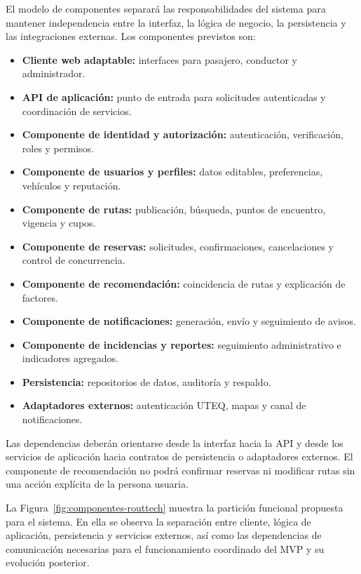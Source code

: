 \documentclass[12pt,a4paper]{article}
\begin{document}
El modelo de componentes separará las responsabilidades del sistema para mantener independencia entre la interfaz, la lógica de negocio, la persistencia y las integraciones externas. Los componentes previstos son:

\begin{itemize}
  \item \textbf{Cliente web adaptable:} interfaces para pasajero, conductor y administrador.
  \item \textbf{API de aplicación:} punto de entrada para solicitudes autenticadas y coordinación de servicios.
  \item \textbf{Componente de identidad y autorización:} autenticación, verificación, roles y permisos.
  \item \textbf{Componente de usuarios y perfiles:} datos editables, preferencias, vehículos y reputación.
  \item \textbf{Componente de rutas:} publicación, búsqueda, puntos de encuentro, vigencia y cupos.
  \item \textbf{Componente de reservas:} solicitudes, confirmaciones, cancelaciones y control de concurrencia.
  \item \textbf{Componente de recomendación:} coincidencia de rutas y explicación de factores.
  \item \textbf{Componente de notificaciones:} generación, envío y seguimiento de avisos.
  \item \textbf{Componente de incidencias y reportes:} seguimiento administrativo e indicadores agregados.
  \item \textbf{Persistencia:} repositorios de datos, auditoría y respaldo.
  \item \textbf{Adaptadores externos:} autenticación UTEQ, mapas y canal de notificaciones.
\end{itemize}

Las dependencias deberán orientarse desde la interfaz hacia la API y desde los servicios de aplicación hacia contratos de persistencia o adaptadores externos. El componente de recomendación no podrá confirmar reservas ni modificar rutas sin una acción explícita de la persona usuaria.


La Figura~\ref{fig:componentes-routtech} muestra la partición funcional propuesta para el sistema. En ella se observa la separación entre cliente, lógica de aplicación, persistencia y servicios externos, así como las dependencias de comunicación necesarias para el funcionamiento coordinado del MVP y su evolución posterior.
\end{document}
